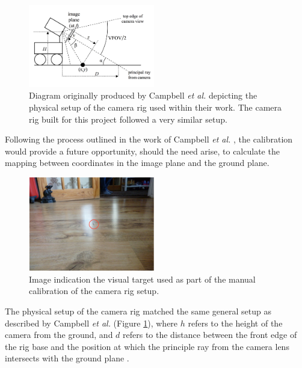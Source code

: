 \begin{figure}
\vspace{-20pt}
  \begin{center}
    \includegraphics[width=0.49\textwidth]{images/cam_setup.png}
  \end{center}
  \vspace{-10pt}
  \caption{Diagram originally produced by Campbell \textit{et al.} \cite{campbell} depicting the physical setup of the camera rig used within their work. The camera rig built for this project followed a very similar setup.}
  \label{fig:setup}
\end{figure}

Following the process outlined in the work of Campbell \textit{et al.} \cite{campbell}, the calibration would provide a future opportunity, should the need arise, to calculate the mapping between coordinates in the image plane and the ground plane.

\begin{figure}
  \begin{center}
    \includegraphics[width=0.49\textwidth]{images/cam_target.png}
  \end{center}
  \vspace{-10pt}
  \caption{Image indication the visual target used as part of the manual calibration of the camera rig setup.}
  \label{fig:target}
  \vspace{-10pt}
\end{figure}

The physical setup of the camera rig matched the same general setup as described by Campbell \textit{et al.} \cite{campbell} (Figure \ref{fig:setup}), where $h$ refers to the height of the camera from the ground, and $d$ refers to the distance between the front edge of the rig base and the position at which the principle ray from the camera lens intersects with the ground plane \cite{campbell}.

